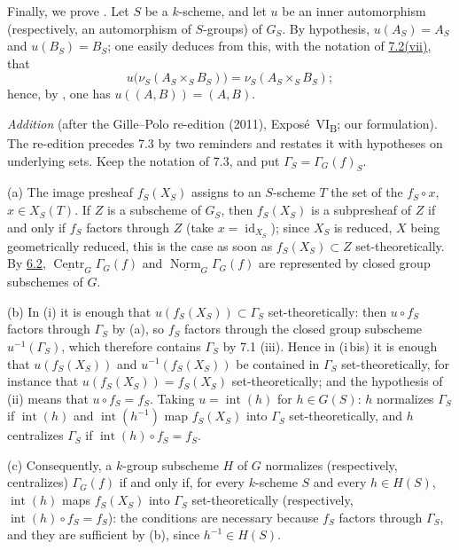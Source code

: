 Finally, we prove \textup{}. Let \(S\) be a \(k\)-scheme,
and let \(u\) be an inner automorphism (respectively, an
automorphism of \(S\)-groups) of \(G_S\). By hypothesis,
\(u(A_S)=A_S\) and \(u(B_S)=B_S\); one easily deduces from this,
with the notation of \hyperref[def:sga3-VIB-7.2-vii]{7.2\textup{(vii)}}, that
\label{form:sga3-VIB-7.3-v-commutator-image}%
\[
  u\bigl(\nu_S(A_S\times_SB_S)\bigr)=\nu_S(A_S\times_SB_S);
\]
hence, by \textup{}, one has \(u((A,B))=(A,B)\).

\medskip\noindent
\emph{Addition} (after the Gille--Polo re-edition (2011), Exposé~VI\textsubscript{B}; our
formulation). The re-edition precedes 7.3 by two reminders and restates it with hypotheses on
underlying sets. Keep the notation of 7.3, and put \(\Gamma_S=\Gamma_G(f)_S\).

(a) The image presheaf \(f_S(X_S)\) assigns to an \(S\)-scheme \(T\) the set of the \(f_S\circ x\),
\(x\in X_S(T)\). If \(Z\) is a subscheme of \(G_S\), then \(f_S(X_S)\) is a subpresheaf of \(Z\) if and only
if \(f_S\) factors through \(Z\) (take \(x=\operatorname{id}_{X_S}\)); since \(X_S\) is reduced, \(X\)
being geometrically reduced, this is the case as soon as \(f_S(X_S)\subset Z\) set-theoretically. By
\hyperref[prop:sga3-VIB-6.2]{6.2}, \(\underline{\operatorname{Centr}}_G\Gamma_G(f)\) and
\(\underline{\operatorname{Norm}}_G\Gamma_G(f)\) are represented by closed group subschemes of \(G\).

(b) In (i) it is enough that \(u(f_S(X_S))\subset\Gamma_S\) set-theoretically: then \(u\circ f_S\) factors
through \(\Gamma_S\) by (a), so \(f_S\) factors through the closed group subscheme \(u^{-1}(\Gamma_S)\),
which therefore contains \(\Gamma_S\) by 7.1 (iii). Hence in (i\,bis) it is enough that \(u(f_S(X_S))\) and
\(u^{-1}(f_S(X_S))\) be contained in \(\Gamma_S\) set-theoretically, for instance that
\(u(f_S(X_S))=f_S(X_S)\) set-theoretically; and the hypothesis of (ii) means that \(u\circ f_S=f_S\).
Taking \(u=\operatorname{int}(h)\) for \(h\in G(S)\): \(h\) normalizes \(\Gamma_S\) if
\(\operatorname{int}(h)\) and \(\operatorname{int}(h^{-1})\) map \(f_S(X_S)\) into \(\Gamma_S\)
set-theoretically, and \(h\) centralizes \(\Gamma_S\) if \(\operatorname{int}(h)\circ f_S=f_S\).

(c) Consequently, a \(k\)-group subscheme \(H\) of \(G\) normalizes (respectively, centralizes)
\(\Gamma_G(f)\) if and only if, for every \(k\)-scheme \(S\) and every \(h\in H(S)\),
\(\operatorname{int}(h)\) maps \(f_S(X_S)\) into \(\Gamma_S\) set-theoretically (respectively,
\(\operatorname{int}(h)\circ f_S=f_S\)): the conditions are necessary because \(f_S\) factors through
\(\Gamma_S\), and they are sufficient by (b), since \(h^{-1}\in H(S)\).

